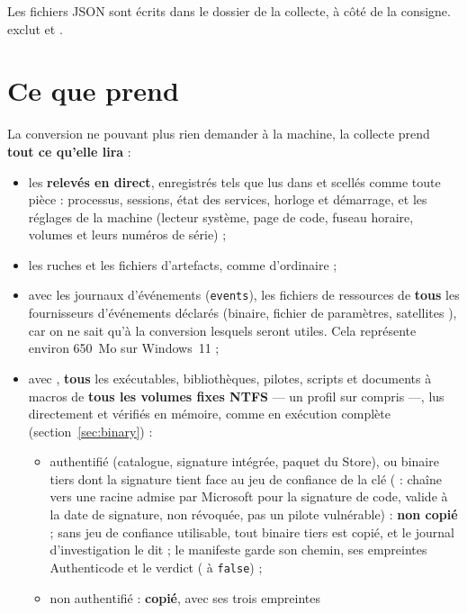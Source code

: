 \documentclass[11pt,a4paper,oneside]{report}
\begin{document}
Les fichiers JSON sont écrits dans le dossier de la collecte, à côté de la
consigne.  exclut  et .

\section{Ce que prend }

La conversion ne pouvant plus rien demander à la machine, la collecte prend
\textbf{tout ce qu'elle lira} :
\begin{itemize}
  \item les \textbf{relevés en direct}, enregistrés tels que lus dans
         et scellés comme toute pièce :
        processus, sessions, état des services, horloge et démarrage, et les
        réglages de la machine (lecteur système, page de code, fuseau horaire,
        volumes et leurs numéros de série) ;
  \item les ruches et les fichiers d'artefacts, comme d'ordinaire ;
  \item avec les journaux d'événements (\texttt{events}), les fichiers de ressources de \textbf{tous} les
        fournisseurs d'événements déclarés (binaire, fichier de paramètres,
        satellites ), car on ne sait qu'à la conversion lesquels
        seront utiles. Cela représente environ 650~Mo sur Windows~11 ;
  \item avec , \textbf{tous} les exécutables, bibliothèques,
        pilotes, scripts et documents à macros de \textbf{tous les volumes fixes
        NTFS} — un profil sur  compris —, lus directement et
        vérifiés en mémoire, comme en exécution complète (section~\ref{sec:binary}) :
        \begin{itemize}
          \item authentifié (catalogue, signature intégrée, paquet du Store), ou
                binaire tiers dont la signature tient face au jeu de confiance de
                la clé ( : chaîne vers une racine admise par
                Microsoft pour la signature de code, valide à la date de
                signature, non révoquée, pas un pilote vulnérable) :
                \textbf{non copié} ; sans jeu de confiance utilisable, tout
                binaire tiers est copié, et le journal d'investigation le dit ; le manifeste garde son chemin, ses empreintes
                Authenticode et le verdict ( à \texttt{false}) ;
          \item non authentifié : \textbf{copié}, avec ses trois empreintes

\end{itemize}
\end{itemize}
\end{document}
